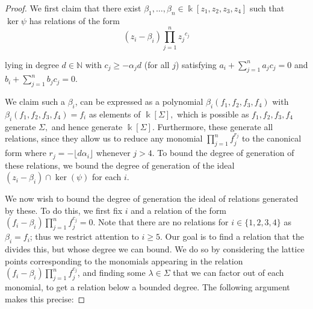 \documentclass{amsart}
\theoremstyle{plain}
\theoremstyle{definition}
\theoremstyle{remark}
\numberwithin{equation}{section}
\newcommand\bk{{\Bbbk}}
\newcommand\bida{a}
\newcommand\bidb{b}
\begin{document}
\begin{proof}
We first claim that there exist $\beta_1, \ldots, \beta_n\in \bk[z_1, z_2, z_3, z_4]$
 such that $\ker \psi$ has relations of the form
\begin{equation}
\label{eqn:hirz-relations-psi}
	(z_i - \beta_i)\prod_{j=1}^n {z_j}^{c_{j}}
\end{equation}

\noindent
lying in degree $d \in \mathbb{N}$
with $c_j \ge -\alpha_j d$ (for all $j$) satisfying $\bida_i + \sum_{j = 1}
^n \bida_j c_j = 0$ and $\bidb_i + \sum_{j=1}^n \bidb_j c_j = 0$.

We claim such a $\beta_i$,
can be expressed as a polynomial $\beta_i(f_1,f_2,f_3,f_4)$ with 
$\beta_i(f_1,f_2,f_3,f_4) = f_i$
as elements of $\bk[\Sigma],$ which is possible as $f_1,f_2,f_3,f_4$ generate $\Sigma,$ and hence generate $\bk[\Sigma]$. Furthermore, these
generate all relations, since they allow us to reduce any monomial $\prod_{j =
1}^n f_j^{r_j}$ to the canonical form where $r_j = - \lfloor d \alpha_i
\rfloor$
 whenever $j > 4$.  To bound the degree of generation of these relations, we bound the degree of generation of the ideal $(z_i - \beta_i) \cap \ker(\psi)$ for each $i$.

We now wish to bound the degree of generation the ideal of relations generated by these.  To do this, we first fix $i$ and a relation of the form $(f_i - \beta_i)\prod_{j=1}^n f_j^{c_j}=0.$ Note that there are no relations for $i\in \{1, 2, 3, 4\}$ as $\beta_i = f_i$; thus we restrict attention to $i \ge 5$. Our goal is to find a relation that the divides this, but whose degree we can bound. We do so by considering the lattice points corresponding to the monomials appearing in the relation $(f_i - \beta_i)\prod_{j=1}^n f_j^{c_j}$, and finding some $\lambda\in \Sigma$
that we can factor out of each monomial, to get a relation below a bounded degree.  The following argument makes this precise:


\end{proof}
\end{document}
